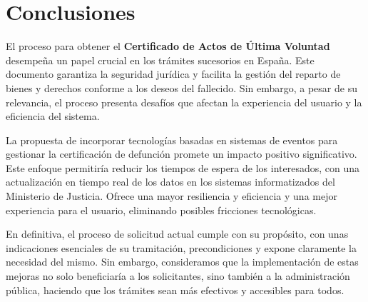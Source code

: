 \part{Conclusiones}
El proceso para obtener el \textbf{Certificado de Actos de Última Voluntad} desempeña un papel crucial en los trámites sucesorios en España. Este documento garantiza la seguridad jurídica y facilita la gestión del reparto de bienes y derechos conforme a los deseos del fallecido. Sin embargo, a pesar de su relevancia, el proceso presenta desafíos que afectan la experiencia del usuario y la eficiencia del sistema.

La propuesta de incorporar tecnologías basadas en sistemas de eventos para gestionar la certificación de defunción promete un impacto positivo significativo. Este enfoque permitiría reducir los tiempos de espera de los interesados, con una actualización en tiempo real de los datos en los sistemas informatizados del Ministerio de Justicia. Ofrece una mayor resiliencia y eficiencia y una mejor experiencia para el usuario, eliminando posibles fricciones tecnológicas.

En definitiva, el proceso de solicitud actual cumple con su propósito, con unas indicaciones esenciales de su tramitación, precondiciones y expone claramente la necesidad del mismo. Sin embargo, consideramos que la implementación de estas mejoras no solo beneficiaría a los solicitantes, sino también a la administración pública, haciendo que los trámites sean más efectivos y accesibles para todos.
